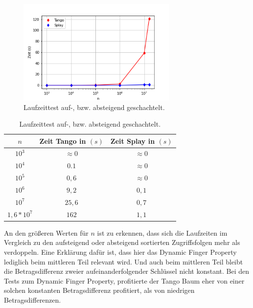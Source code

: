 \documentclass[a4paper,12pt]{article}
\begin{document}
\begin{figure}[H]
	\centering
	\includegraphics[width=0.7\textwidth]{"Medien/laufzeittest/diagramm/sorted3"}
	\caption{Laufzeittest auf-, bzw. absteigend geschachtelt.}
\end{figure}
\begin{table}[H]
	\begin{center}
		\begin{tabular}[c]{|c|c|c|}
			\hline
		$n$ & Zeit Tango in $\left(s\right)$ &Zeit Splay in $\left(s\right)$ \\
		\hline
		$10^3$ & $\approx 0$ &$\approx 0$ \\
		\hline
		$10^4$  & $0.1$ &$\approx 0$  \\
		\hline
		$10^5$  & $0,6$ &$\approx 0$  \\
		\hline
		$10^6$  & $9,2$ &$0,1$  \\
		\hline
		$10^7$  & $25,6$ &$0,7$  \\
		\hline
		$1,6 *10^7$  & $162$ &$1,1$  \\
		\hline
		\end{tabular}
		\caption{Laufzeittest auf-, bzw. absteigend geschachtelt.} 
	\end{center}
\end{table}
  
\noindent An den größeren Werten für $n$ ist zu erkennen, dass sich die Laufzeiten im Vergleich zu den aufsteigend oder absteigend sortierten Zugriffsfolgen mehr als verdoppeln. Eine Erklärung dafür ist, dass hier das Dynamic Finger Property lediglich beim mittleren Teil relevant wird. Und auch beim mittleren Teil bleibt die Betragsdifferenz zweier aufeinanderfolgender Schlüssel nicht konstant. Bei den Tests zum Dynamic Finger Property, profitierte der Tango Baum eher von einer solchen konstanten Betragsdifferenz profitiert, als von niedrigen Betragsdifferenzen.

  

\end{document}
